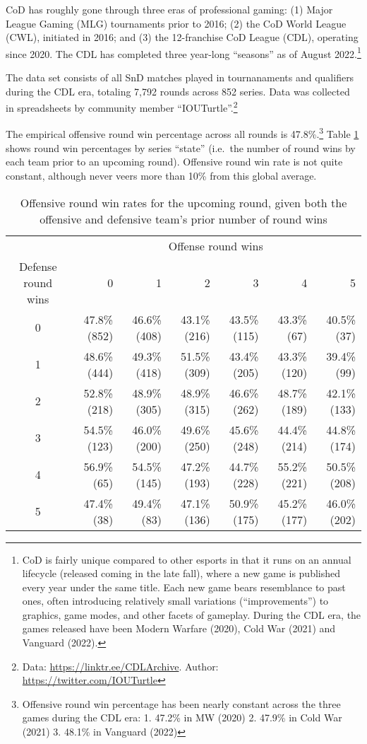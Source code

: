 \documentclass{article}
\begin{document}
CoD has roughly gone through three eras of professional gaming: (1)
Major League Gaming (MLG) tournaments prior to 2016; (2) the CoD World
League (CWL), initiated in 2016; and (3) the 12-franchise CoD League
(CDL), operating since 2020. The CDL has completed three year-long
``seasons'' as of August 2022.\footnote{CoD is fairly unique compared to
  other esports in that it runs on an annual lifecycle (released coming
  in the late fall), where a new game is published every year under the
  same title. Each new game bears resemblance to past ones, often
  introducing relatively small variations (``improvements'') to
  graphics, game modes, and other facets of gameplay. During the CDL
  era, the games released have been Modern Warfare (2020), Cold War
  (2021) and Vanguard (2022).}

The data set consists of all SnD matches played in tournanaments and
qualifiers during the CDL era, totaling 7,792 rounds across 852 series.
Data was collected in spreadsheets by community member
``IOUTurtle''.\footnote{Data: \url{https://linktr.ee/CDLArchive}.
  Author: \url{https://twitter.com/IOUTurtle}}

The empirical offensive round win percentage across all rounds is
47.8\%.\footnote{Offensive round win percentage has been nearly constant
  across the three games during the CDL era: 1. 47.2\% in MW (2020) 2.
  47.9\% in Cold War (2021) 3. 48.1\% in Vanguard (2022)} Table
\ref{tbl:cod-o-win-prop-by-series-state} shows round win percentages by
series ``state'' (i.e.~the number of round wins by each team prior to an
upcoming round). Offensive round win rate is not quite constant,
although never veers more than 10\% from this global average.

\begin{longtable}{crrrrrr}
  \caption{Offensive round win rates for the upcoming round, given both the offensive and defensive team's prior number of round wins}\label{tbl:cod-o-win-prop-by-series-state} \\
  \toprule
   & \multicolumn{6}{c}{Offense round wins} \\ 
  \cmidrule(lr){2-7}
  Defense round wins & 0 & 1 & 2 & 3 & 4 & 5 \\ 
    \midrule
    0 & 47.8\%
    (852) & 46.6\%
    (408) & 43.1\%
    (216) & 43.5\%
    (115) & 43.3\%
    (67) & 40.5\%
    (37) \\ 
    1 & 48.6\%
    (444) & 49.3\%
    (418) & 51.5\%
    (309) & 43.4\%
    (205) & 43.3\%
    (120) & 39.4\%
    (99) \\ 
    2 & 52.8\%
    (218) & 48.9\%
    (305) & 48.9\%
    (315) & 46.6\%
    (262) & 48.7\%
    (189) & 42.1\%
    (133) \\ 
    3 & 54.5\%
    (123) & 46.0\%
    (200) & 49.6\%
    (250) & 45.6\%
    (248) & 44.4\%
    (214) & 44.8\%
    (174) \\ 
    4 & 56.9\%
    (65) & 54.5\%
    (145) & 47.2\%
    (193) & 44.7\%
    (228) & 55.2\%
    (221) & 50.5\%
    (208) \\ 
    5 & 47.4\%
    (38) & 49.4\%
    (83) & 47.1\%
    (136) & 50.9\%
    (175) & 45.2\%
    (177) & 46.0\%
    (202) \\ 
  \bottomrule
\end{longtable}
\end{document}
